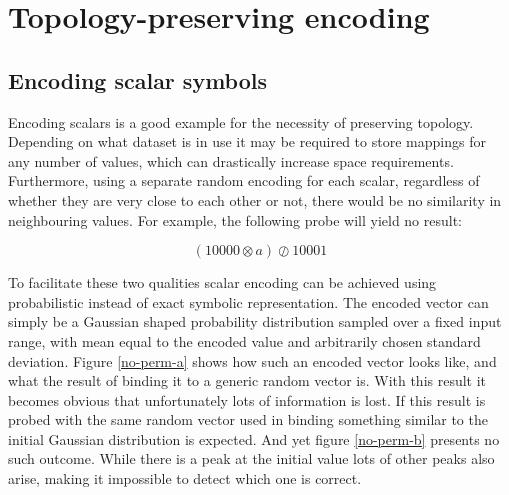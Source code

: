 \documentclass[journal]{journal}
\begin{document}
	\section{Topology-preserving encoding}
	
	\subsection{Encoding scalar symbols}
	
	Encoding scalars is a good example for the necessity of preserving topology.
Depending on what dataset is in use it may be required to store mappings for any number of values, which can drastically increase space requirements.
Furthermore, using a separate random encoding for each scalar, regardless of whether they are very close to each other or not, there would be no similarity in neighbouring values.
For example, the following probe will yield no result:
	
	\begin{equation}
	(10000 \otimes a) \oslash 10001
	\end{equation}
	
	To facilitate these two qualities scalar encoding can be achieved using probabilistic instead of exact symbolic representation. 
The encoded vector can simply be a Gaussian shaped probability distribution sampled over a fixed input range, with mean equal to the encoded value and arbitrarily chosen standard deviation.
Figure \ref{no-perm-a} shows how such an encoded vector looks like, and what the result of binding it to a generic random vector is.
With this result it becomes obvious that unfortunately lots of information is lost.
If this result is probed with the same random vector used in binding something similar to the initial Gaussian distribution is expected.
And yet figure \ref{no-perm-b} presents no such outcome.
While there is a peak at the initial value lots of other peaks also arise, making it impossible to detect which one is correct.
\end{document}
